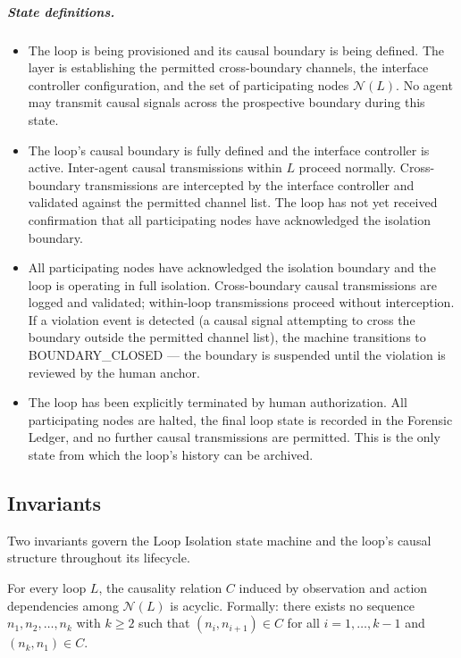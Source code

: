 \subparagraph{State definitions.}

\begin{itemize}\itemsep=0pt
\item[\textbf{BOUNDARY\_OPEN.}] The loop is being provisioned and its causal boundary is being defined. The \purpose{} layer is establishing the permitted cross-boundary channels, the interface controller configuration, and the set of participating nodes $\mathcal{N}(L)$. No agent may transmit causal signals across the prospective boundary during this state.

\item[\textbf{BOUNDARY\_CLOSED.}] The loop's causal boundary is fully defined and the interface controller is active. Inter-agent causal transmissions within $L$ proceed normally. Cross-boundary transmissions are intercepted by the interface controller and validated against the permitted channel list. The loop has not yet received confirmation that all participating nodes have acknowledged the isolation boundary.

\item[\textbf{LOOP\_ISOLATED.}] All participating nodes have acknowledged the isolation boundary and the loop is operating in full isolation. Cross-boundary causal transmissions are logged and validated; within-loop transmissions proceed without interception. If a violation event is detected (a causal signal attempting to cross the boundary outside the permitted channel list), the machine transitions to BOUNDARY\_CLOSED — the boundary is suspended until the violation is reviewed by the human anchor.

\item[\textbf{LOOP\_TERMINATED.}] The loop has been explicitly terminated by human authorization. All participating nodes are halted, the final loop state is recorded in the Forensic Ledger, and no further causal transmissions are permitted. This is the only state from which the loop's history can be archived.
\end{itemize}

\subsection{Invariants}\label{sec:loop-invariants}

Two invariants govern the Loop Isolation state machine and the loop's causal structure throughout its lifecycle.

\begin{invariant}\label{inv:loop-acyclicity}
For every loop $L$, the causality relation $C$ induced by observation and action dependencies among $\mathcal{N}(L)$ is acyclic. Formally: there exists no sequence $n_1, n_2, \ldots, n_k$ with $k \geq 2$ such that $(n_i, n_{i+1}) \in C$ for all $i = 1, \ldots, k-1$ and $(n_k, n_1) \in C$.
\end{invariant}

